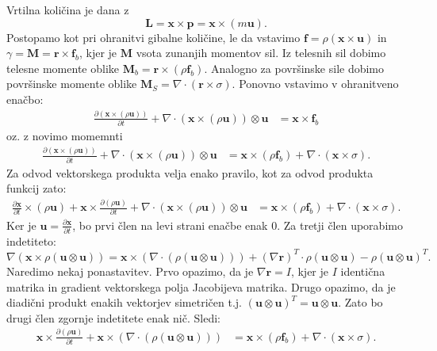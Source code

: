 \documentclass[mat2, tisk]{fmfdelo}
\newcommand{\bd}{\textbf}
\begin{document}
Vrtilna količina je dana z 
\begin{equation}
\bd{L} = \bd{x} \times \bd{p} = \bd{x} \times (m\bd{u}).
\end{equation}
Postopamo kot pri ohranitvi gibalne količine, le da vstavimo $\bd{f} = \rho (\bd{x} \times \bd{u})$ in $\gamma = \bd{M} = \bd{r}\times \bd{f}_b$, kjer je $\bd{M}$ vsota zunanjih momentov sil. 
Iz telesnih sil dobimo telesne momente oblike $\bd{M}_b = \bd{r}\times (\rho\bd{f}_b)$. Analogno za površinske sile dobimo
površinske momente oblike $\bd{M}_S = \nabla \cdot (\bd{r} \times \sigma)$. Ponovno vstavimo v ohranitveno enačbo:
\begin{align*}
\frac{\partial (\bd{x} \times (\rho\bd{u}))}{\partial t} + \nabla \cdot (\bd{x} \times (\rho \bd{u})) \otimes \bd{u} &= \bd{x}\times \bd{f}_b
\end{align*}
oz. z novimo momemnti 
\begin{align*}
  \frac{\partial (\bd{x} \times (\rho\bd{u}))}{\partial t} + \nabla \cdot (\bd{x} \times (\rho \bd{u})) \otimes \bd{u} &= \bd{x}\times (\rho \bd{f}_b) + \nabla \cdot (\bd{x} \times \sigma).
\end{align*}
Za odvod vektorskega produkta velja enako pravilo, kot za odvod produkta funkcij zato:
\begin{align*}
\frac{\partial \bd{x}}{\partial t} \times (\rho \bd{u}) + \bd{x} \times \frac{\partial (\rho\bd{u})}{\partial t} + \nabla \cdot (\bd{x} \times (\rho \bd{u})) \otimes \bd{u} &= \bd{x}\times (\rho \bd{f}_b) + \nabla \cdot (\bd{x} \times \sigma). 
\end{align*}
Ker je $\bd{u} = \frac{\partial \bd{x}}{\partial t}$, bo prvi člen na levi strani enačbe enak 0.
Za tretji člen uporabimo indetiteto:
\begin{equation}
\nabla(\bd{x} \times \rho(\bd{u}\otimes \bd{u})) = \bd{x}\times (\nabla\cdot (\rho(\bd{u}\otimes \bd{u}))) + (\nabla \bd{r})^T \cdot \rho(\bd{u}\otimes \bd{u}) - \rho (\bd{u}\otimes \bd{u})^T.
\end{equation}
Naredimo nekaj ponastavitev. Prvo opazimo, da je $\nabla \bd{r} = I$, kjer je $I$ identična matrika in gradient 
vektorskega polja Jacobijeva matrika. Drugo opazimo, da je diadični produkt 
enakih vektorjev simetričen t.j. $(\bd{u}\otimes \bd{u})^T = \bd{u}\otimes \bd{u}$. Zato bo drugi člen 
zgornje indetitete enak nič. Sledi:
\begin{align*}
\bd{x} \times \frac{\partial (\rho\bd{u})}{\partial t} + \bd{x} \times (\nabla\cdot (\rho(\bd{u}\otimes \bd{u}))) &= \bd{x}\times (\rho \bd{f}_b) + \nabla \cdot (\bd{x} \times \sigma). 
\end{align*}
\end{document}
